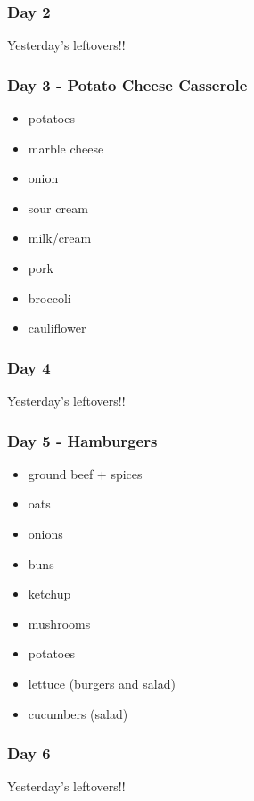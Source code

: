 \documentclass[11pt, a4paper]{article}
\begin{document}
\subsubsection{Day 2}
\vspace{1pc}
Yesterday's leftovers!!

\subsubsection{Day 3 - Potato Cheese Casserole}
\vspace{1pc}
\begin{itemize}
\item potatoes
\item marble cheese
\item onion
\item sour cream
\item milk/cream
\item pork
\item broccoli
\item cauliflower
\end{itemize}

\subsubsection{Day 4}
\vspace{1pc}
Yesterday's leftovers!!

\subsubsection{Day 5 - Hamburgers}
\vspace{1pc}
\begin{itemize}
\item ground beef $+$ spices
\item oats
\item onions
\item buns
\item ketchup
\item mushrooms
\item potatoes
\item lettuce (burgers and salad)
\item cucumbers (salad)
\end{itemize}

\subsubsection{Day 6}
\vspace{1pc}
Yesterday's leftovers!!
\end{document}
